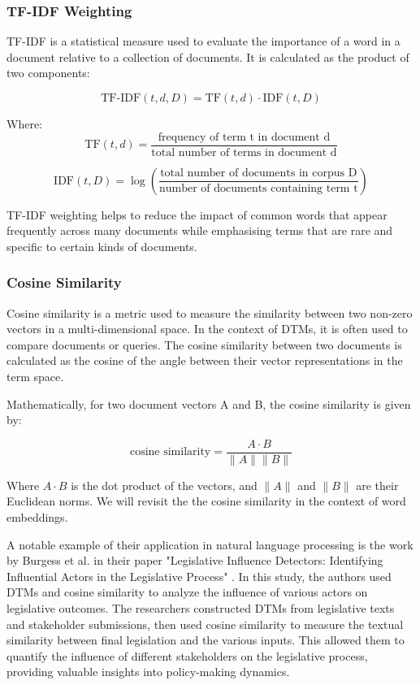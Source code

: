 \documentclass[a4paper, oneside]{discothesis}
\begin{document}
\subsubsection{TF-IDF Weighting}
TF-IDF is a statistical measure used to evaluate the importance of a word in a document relative to a collection of documents. It is calculated as the product of two components:

\begin{equation}
\text{TF-IDF}(t,d,D) = \text{TF}(t,d) \cdot \text{IDF}(t,D)
\end{equation}

Where:
\begin{equation}
\text{TF}(t,d) = \frac{\text{frequency of term t in document d}}{\text{total number of terms in document d}}
\end{equation}

\begin{equation}
\text{IDF}(t,D) = \log\left(\frac{\text{total number of documents in corpus D}}{\text{number of documents containing term t}}\right)
\end{equation}

TF-IDF weighting helps to reduce the impact of common words that appear frequently across many documents while emphasising terms that are rare and specific to certain kinds of documents.

\subsubsection{Cosine Similarity}
Cosine similarity is a metric used to measure the similarity between two non-zero vectors in a multi-dimensional space. In the context of DTMs, it is often used to compare documents or queries. The cosine similarity between two documents is calculated as the cosine of the angle between their vector representations in the term space.

Mathematically, for two document vectors A and B, the cosine similarity is given by:

\begin{equation}
\text{cosine similarity} = \frac{A \cdot B}{\|A\| \|B\|}
\end{equation}

Where $A \cdot B$ is the dot product of the vectors, and $\|A\|$ and $\|B\|$ are their Euclidean norms. We will revisit the the cosine similarity in the context of word embeddings. 

A notable example of their application in natural language processing is the work by Burgess et al. in their paper "Legislative Influence Detectors: Identifying Influential Actors in the Legislative Process" \cite{burgess2016legislative}. In this study, the authors used DTMs and cosine similarity to analyze the influence of various actors on legislative outcomes.
The researchers constructed DTMs from legislative texts and stakeholder submissions, then used cosine similarity to measure the textual similarity between final legislation and the various inputs. This allowed them to quantify the influence of different stakeholders on the legislative process, providing valuable insights into policy-making dynamics.
\end{document}
